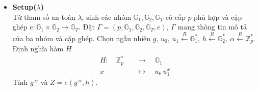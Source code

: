 \documentclass[class=report, crop=false]{standalone}
\begin{document}
		\begin{itemize}[leftmargin=1cm, itemindent=-1cm]
			\item[] {\sffamily\bfseries Setup($\lambda$)} \\
			Từ tham số an toàn $\lambda$, sinh các nhóm $\mathbb{G}_1, \mathbb{G}_2, \mathbb{G}_T$ có cấp $p$ phù hợp và cặp ghép $e: \mathbb{G}_1 \times \mathbb{G}_2 \rightarrow \mathbb{G}_T$. Đặt $\Gamma = (p, \mathbb{G}_1, \mathbb{G}_2, \mathbb{G}_T, e)$, $\Gamma$ mang thông tin mô tả của ba nhóm và cặp ghép. Chọn ngẫu nhiên $g,\, u_0,\, u_1 \xleftarrow{R} \mathbb{G}_1^*,\ h \xleftarrow{R} \mathbb{G}_2^*,\ \alpha \xleftarrow{R} \mathbb{Z}_p^*$. \\
			Định nghĩa hàm $H$
			\begin{align*}
				H:\quad 	\mathbb{Z}_p^* 	\quad &\rightarrow 	\quad 	\mathbb{G}_1 \\
							x 				\quad &\mapsto 		\quad 	u_0 \, u_1^x
			\end{align*}
			Tính $g\,^\alpha$ và $Z = e(g\,^\alpha, h)$.


\end{itemize}
\end{document}
